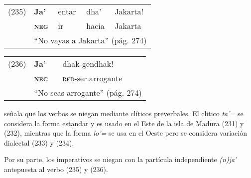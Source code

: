 {%
\begin{tabular}{lllll}
(235) & \textbf{Ja'} & entar & dha’ & Jakarta! \\
& \textsc{\textbf{neg}} & ir & hacia & Jakarta \\
& \multicolumn{4}{l}{``No vayas a Jakarta'' (pág. 274)}
\end{tabular} \vspace{0.5cm}

\begin{tabular}{lll}
(236) & \textbf{Ja}' & dhak-gendhak! \\
& \textsc{\textbf{neg}} & \textsc{red}-ser.arrogante \\
& \multicolumn{2}{l}{``No seas arrogante'' (pág. 274)}
\end{tabular} \vspace{0.5cm}

}

\textcolor{MidnightBlue}{\citet{madu}} señala que los verbos se niegan mediante clíticos preverbales. El clitico {\setmainfont{Charis SIL} \textit{ta'=}} se considera la forma estandar y es usado en el Este de la isla de Madura (231) y (232), mientras que la forma {\setmainfont{Charis SIL} \textit{lo'=}} se usa en el Oeste pero se considera variación dialectal (233) y (234).

Por su parte, los imperativos se niegan con la partícula independiente {\setmainfont{Charis SIL} \textit{(n)ja'}} antepuesta al verbo (235) y (236).